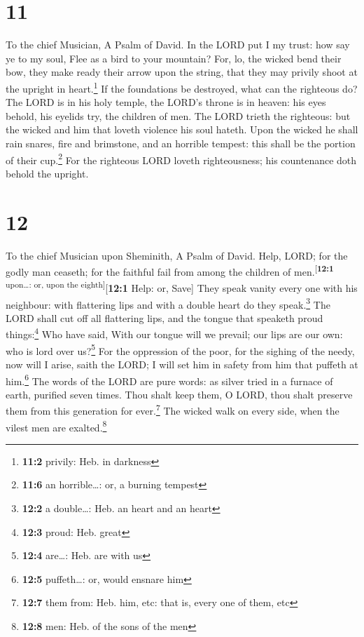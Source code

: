 \hypertarget{section-10}{%
\section{11}\label{section-10}}

To the chief Musician, A Psalm of David.  In the LORD put
I my trust: how say ye to my soul, Flee as a bird to your mountain?
 For, lo, the wicked bend their bow, they make ready their
arrow upon the string, that they may privily shoot at the upright in
heart.\footnote{\textbf{11:2} privily: Heb. in darkness} 
If the foundations be destroyed, what can the righteous do?
 The LORD is in his holy temple, the LORD's throne is in
heaven: his eyes behold, his eyelids try, the children of men.
 The LORD trieth the righteous: but the wicked and him
that loveth violence his soul hateth.  Upon the wicked he
shall rain snares, fire and brimstone, and an horrible tempest: this
shall be the portion of their cup.\footnote{\textbf{11:6} an
  horrible\ldots: or, a burning tempest}  For the
righteous LORD loveth righteousness; his countenance doth behold the
upright.

\hypertarget{section-11}{%
\section{12}\label{section-11}}

To the chief Musician upon Sheminith, A Psalm of David. 
Help, LORD; for the godly man ceaseth; for the faithful fail from among
the children of men.\textsuperscript{{[}\textbf{12:1} upon\ldots: or,
upon the eighth{]}}{[}\textbf{12:1} Help: or, Save{]} 
They speak vanity every one with his neighbour: with flattering lips and
with a double heart do they speak.\footnote{\textbf{12:2} a
  double\ldots: Heb. an heart and an heart}  The LORD
shall cut off all flattering lips, and the tongue that speaketh proud
things:\footnote{\textbf{12:3} proud: Heb. great}  Who
have said, With our tongue will we prevail; our lips are our own: who is
lord over us?\footnote{\textbf{12:4} are\ldots: Heb. are with us}
 For the oppression of the poor, for the sighing of the
needy, now will I arise, saith the LORD; I will set him in safety from
him that puffeth at him.\footnote{\textbf{12:5} puffeth\ldots: or, would
  ensnare him}  The words of the LORD are pure words: as
silver tried in a furnace of earth, purified seven times. 
Thou shalt keep them, O LORD, thou shalt preserve them from this
generation for ever.\footnote{\textbf{12:7} them from: Heb. him, etc:
  that is, every one of them, etc}  The wicked walk on
every side, when the vilest men are exalted.\footnote{\textbf{12:8} men:
  Heb. of the sons of the men}

